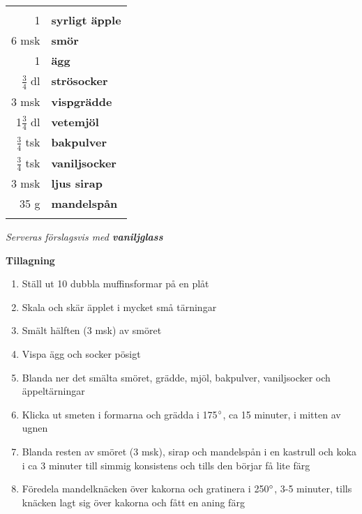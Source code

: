 \documentclass[a4paper,12pt]{article}
\newcommand{\tillb}[1]{\noindent \textit{Serveras förslagsvis med \textbf{#1}} \vspace{1cm}}
\begin{document}
\begin{table}[H]
	\begin{tabular}{rl}
	\hline
	&\\
		1 & \textbf{syrligt äpple}\\
		6 msk & \textbf{smör}\\
		1 & \textbf{ägg}\\
		$\frac{3}{4}$ dl & \textbf{strösocker}\\
		3 msk & \textbf{vispgrädde}\\
		1$\frac{3}{4}$ dl & \textbf{vetemjöl}\\
		$\frac{3}{4}$ tsk & \textbf{bakpulver}\\
		$\frac{3}{4}$ tsk & \textbf{vaniljsocker}\\
		3 msk & \textbf{ljus sirap}\\
		35 g & \textbf{mandelspån}\\
	&\\
	\hline
	\end{tabular}
\end{table}

\tillb{vaniljglass}

\begin{multicols*}{2}

\noindent \textbf{Tillagning}
\begin{enumerate}
	\itemsep0cm
	\item Ställ ut 10 dubbla muffins\-formar på en plåt
	\item Skala och skär äpplet i mycket små tärningar
	\item Smält hälften (3 msk) av \mbox{smöret}
	\item Vispa ägg och socker pösigt
	\item Blanda ner det smälta smöret, grädde, mjöl, bakpulver, vaniljsocker och äppeltärningar
	\item Klicka ut smeten i formarna och grädda i 175$\degree$, ca 15 minuter, i mitten av ugnen
	\item Blanda resten av smöret (3 msk), sirap och mandelspån i en kastrull och koka i ca 3 minuter till simmig konsistens och tills den börjar få lite färg
	\item Föredela mandelknäcken över kakorna och gratinera i 250$\degree$, \mbox{3-5} minuter, tills knäcken lagt sig över kakorna och fått en aning färg
\end{enumerate}

\end{multicols*}
\end{document}
